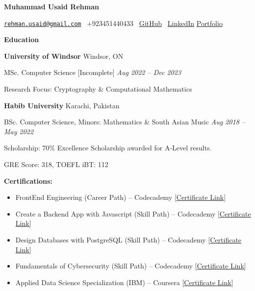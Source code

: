 \documentclass[12pt, a4paper]{article}
\begin{document}
{}\selectfont

\begin{center}
	\Large\textbf{Muhammad Usaid Rehman}\\
	\hrulefill
\end{center}

\begin{center}
	\href{mailto:rehman.usaid@gmail.com}{\texttt{rehman.usaid@gmail.com}} \textbullet \ +923451440433 \textbullet \ \href{https://github.com/m-usaid99}{GitHub} \textbullet \ \href{https://www.linkedin.com/in/muhammad-usaid-rehman-aa8b64202/}{LinkedIn} \textbullet \href{https://musaid-rehman.vercel.app}{Portfolio}
\end{center}

\begin{center}
	\large\textbf{Education}
\end{center}

\textbf{University of Windsor}  \hfill Windsor, ON

MSc. Computer Science [Incomplete]  \hfill \textit{Aug 2022 -- Dec 2023}

Research Focus: Cryptography \& Computational Mathematics



\vspace{12pt}
\textbf{Habib University} \hfill Karachi, Pakistan

BSc. Computer Science, Minors: Mathematics \& South Asian Music \hfill \textit{Aug 2018 -- May 2022}

Scholarship: 70\% Excellence Scholarship awarded for A-Level results.

GRE Score: 318, TOEFL iBT: 112

\vspace{12pt}
\textbf{Certifications:}
\begin{itemize}[noitemsep, topsep=0pt, partopsep=0pt, parsep=0pt]
	\item FrontEnd Engineering (Career Path) -- Codecademy \hfill [\href{https://www.codecademy.com/profiles/candyclaws99/certificates/2682884a0719474f96407efe432fdd87}{Certificate Link}]
	\item Create a Backend App with Javascript (Skill Path) -- Codecademy \hfill [\href{https://www.codecademy.com/profiles/candyclaws99/certificates/5cb678013709022f5b908913}{Certificate Link}]
	\item Design Databases with PostgreSQL (Skill Path) -- Codecademy \hfill [{\href{https://www.codecademy.com/profiles/candyclaws99/certificates/5f64e3b492de0000131ecbe0}{Certificate Link}}]
	\item Fundamentals of Cybersecurity (Skill Path) -- Codecademy \hfill [\href{https://www.codecademy.com/profiles/candyclaws99/certificates/06984a073b064e61879cca3e82a9b3d2}{Certificate Link}]
	\item Applied Data Science Specialization (IBM) -- Coursera \hfill [\href{https://coursera.org/share/d030e4f8979b8718d0b067ae3f467d33}{Certificate Link}]
\end{itemize}
\end{document}
